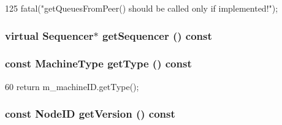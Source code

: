 \begin{DoxyCode}
125     { fatal("getQueuesFromPeer() should be called only if implemented!"); }
\end{DoxyCode}
\hypertarget{classAbstractController_ada806654b26aababb417afe9bfbf66e5}{
\subsubsection[{getSequencer}]{\setlength{\rightskip}{0pt plus 5cm}virtual {\bf Sequencer}$\ast$ getSequencer () const}}
\label{classAbstractController_ada806654b26aababb417afe9bfbf66e5}
\hypertarget{classAbstractController_a7a63a33844df1ce5a3b16096dfbbe0f9}{
\subsubsection[{getType}]{\setlength{\rightskip}{0pt plus 5cm}const MachineType getType () const}}
\label{classAbstractController_a7a63a33844df1ce5a3b16096dfbbe0f9}



\begin{DoxyCode}
60 { return m_machineID.getType(); }
\end{DoxyCode}
\hypertarget{classAbstractController_a35b384df19605d0186339f088df677d5}{
\subsubsection[{getVersion}]{\setlength{\rightskip}{0pt plus 5cm}const {\bf NodeID} getVersion () const}}
\label{classAbstractController_a35b384df19605d0186339f088df677d5}



